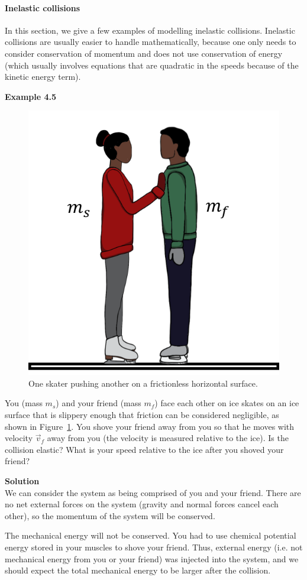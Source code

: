 \paragraph{Inelastic collisions}

In this section, we give a few examples of modelling inelastic collisions. Inelastic collisions are usually easier to handle mathematically, because one only needs to consider conservation of momentum and does not use conservation of energy (which usually involves equations that are quadratic in the speeds because of the kinetic energy term).

\begin{framed}
\textbf{Example 4.5}\\
\begin{figure}[!htbp]
\centering
\includegraphics[width=0.4\linewidth]{files/skaters-3e4f05ca0612b57a349cdcab710b732c.png}
\caption[]{One skater pushing another on a frictionless horizontal surface.}
\label{fig:momentumandcm:skaters}
\end{figure}

You (mass $m_s$) and your friend (mass $m_f$) face each other on ice skates on an ice surface that is slippery enough that friction can be considered negligible, as shown in Figure~\ref{fig:momentumandcm:skaters}. You shove your friend away from you so that he moves with velocity $\vec v_f$ away from you (the velocity is measured relative to the ice). Is the collision elastic? What is your speed relative to the ice after you shoved your friend?

\begin{framed}
\textbf{Solution}\\
We can consider the system as being comprised of you and your friend. There are no net external forces on the system (gravity and normal forces cancel each other), so the momentum of the system will be conserved.

The mechanical energy will not be conserved. You had to use chemical potential energy stored in your muscles to shove your friend. Thus, external energy (i.e. not mechanical energy from you or your friend) was injected into the system, and we should expect the total mechanical energy to be larger after the collision.


\end{framed}
\end{framed}

